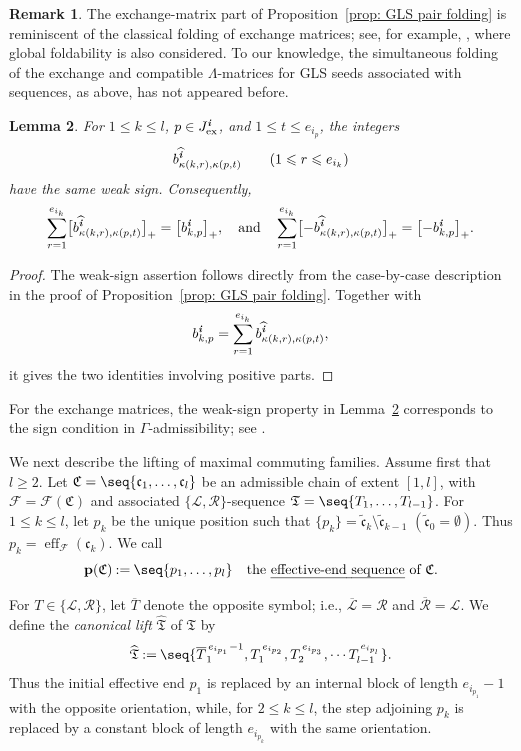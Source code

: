 \documentclass[12pt, leqno]{amsart}
\numberwithin{equation}{section}
\theoremstyle{plain}
\newtheorem{lemma}{Lemma}[section]
\theoremstyle{definition}
\newtheorem{remark}[lemma]{Remark}
\renewcommand{\le}{\leqslant}
\renewcommand{\ge}{\geqslant}
\newcommand{\seteq}{\mathbin{:=}}
\newcommand{\ex}{\mathrm{ex}}
\newcommand{\ii}{ \textbf{\textit{i}}}
\newcommand{\eff}{\operatorname{eff}}
\newcommand{\hii}{{\widehat{\ii}}}
\newcommand{\oT}{\overline{T}}
\newcommand{\ocalL}{\overline{\calL}}
\newcommand{\ocalR}{\overline{\calR}}
\newcommand{\frakC}{\mathfrak{C}}
\newcommand{\frakT}{\mathfrak{T}}
\newcommand{\frakc}{\mathfrak{c}}
\newcommand{\tfrakc}{\widetilde{\frakc}}
\newcommand{\hfrakT}{{\widehat{\frakT}}}
\newcommand{\bfp}{\mathbf{p}}
\newcommand{\calF}{\mathcal{F}}
\newcommand{\calL}{\mathcal{L}}
\newcommand{\calR}{\mathcal{R}}
\newcommand{\qtq}[1][{and}]{\quad\text{{#1}}\quad}
\begin{document}
\begin{remark}
The exchange-matrix part of Proposition~\ref{prop: GLS pair folding} is reminiscent of the
classical folding of exchange matrices; see, for example,
\cite[\S4.4]{FWZ2}, where global foldability is also considered.
To our knowledge, the simultaneous folding of the exchange and
compatible $\Lambda$-matrices for GLS seeds associated with sequences,
as above, has not appeared before.
\end{remark}

\begin{lemma}\label{lem: row fiber weak sign}
For $1\le k\le l$, $p\in J^\ii_{\ex}$, and
$1\le t\le e_{i_p}$, the integers
\[
b^\hii_{\kappa(k,r),\kappa(p,t)}   \qquad   (1\le r\le e_{i_k})
\]
have the same weak sign. Consequently,
\[
\sum_{r=1}^{e_{i_k}} \bigl[b^\hii_{\kappa(k,r),\kappa(p,t)}\bigr]_+
= \bigl[b^\ii_{k,p}\bigr]_+,
\qtq
\sum_{r=1}^{e_{i_k}}  \bigl[-b^\hii_{\kappa(k,r),\kappa(p,t)}\bigr]_+
= \bigl[-b^\ii_{k,p}\bigr]_+.
\]
\end{lemma}

\begin{proof}
The weak-sign assertion follows directly from the case-by-case
description in the proof of Proposition~\ref{prop: GLS pair folding}.
Together with
\[
  b^\ii_{k,p}   =   \sum_{r=1}^{e_{i_k}}   b^\hii_{\kappa(k,r),\kappa(p,t)},
\]
it gives the two identities involving positive parts.
\end{proof}

For the exchange matrices, the weak-sign property in Lemma~\ref{lem: row fiber weak sign}
corresponds to the sign condition in $\Gamma$-admissibility; see
\cite[Definition~4.4.1 and Lemma~4.4.4]{FWZ2}.

\smallskip

We next describe the lifting of maximal commuting families.
Assume first that $l\ge2$.  
Let $\frakC=\seq{\frakc_1,\ldots,\frakc_l}$ be an admissible chain of extent $[1,l]$, with
$\calF=\calF(\frakC)$ and associated  $\{\calL,\calR\}$-sequence{} $\frakT=\seq{T_1,\ldots,T_{l-1}}$.
For $1\le k\le l$, let $p_k$ be the unique position such that
$\{p_k\}=\tfrakc_k\setminus\tfrakc_{k-1}$ $(\tfrakc_0=\emptyset)$.
Thus $p_k=\eff_\calF(\frakc_k)$. We call
\[
\bfp(\frakC)\seteq\seq{p_1,\ldots,p_l} \ \ \text{ the \emph{effective-end sequence} of $\frakC$}.
\]

For $T\in\{\calL,\calR\}$, let $\oT$ denote the opposite symbol; i.e., $\ocalL=\calR$ and $\ocalR=\calL$.
We define the \emph{canonical lift} $\hfrakT$ of $\frakT$ by
\begin{align} \label{eq: hfrakT}
\hfrakT \seteq \seq{ \oT_1^{\,e_{i_{p_1}}-1},  T_1^{\,e_{i_{p_2}}}, T_2^{\,e_{i_{p_3}}},  \cdots T_{l-1}^{\,e_{i_{p_l}}} }.
\end{align}
Thus the initial effective end $p_1$ is replaced by an internal block
of length $e_{i_{p_1}}-1$ with the opposite orientation, while, for
$2\le k\le l$, the step adjoining $p_k$ is replaced by a constant
block of length $e_{i_{p_k}}$ with the same orientation.
\end{document}
